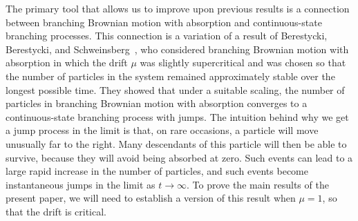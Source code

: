 \documentclass[10pt]{amsart}
\theoremstyle{definition}\newtheorem{defi}[theo]{Definition}\newtheorem{rema}[theo]{Remark}\newtheorem{exam}[theo]{Example}\newtheorem{exem}[theo]{Example}\newtheorem{nota}[theo]{Notation}
\newcommand{\1} {\mathds{1}}
\begin{document}
The primary tool that allows us to improve upon previous results is a connection between branching Brownian motion with absorption and continuous-state branching processes. This connection is a variation of a result of Berestycki, Berestycki, and Schweinsberg~\cite{bbs2}, who considered branching Brownian motion with absorption in which the drift $\mu$ was slightly supercritical and was chosen so that the number of particles in the system remained approximately stable over the longest possible time. They showed that under a suitable scaling, the number of particles in branching Brownian motion with absorption converges to a continuous-state branching process with jumps. The intuition behind why we get a jump process in the limit is that, on rare occasions, a particle will move unusually far to the right. Many descendants of this particle will then be able to survive, because they will avoid being absorbed at zero. Such events can lead to a large rapid increase in the number of particles, and such events become instantaneous jumps in the limit as $t \rightarrow \infty$. To prove the main results of the present paper, we will need to establish a version of this result when $\mu = 1$, so that the drift is critical.
\end{document}
